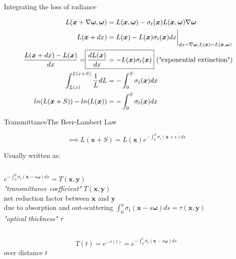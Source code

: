 \documentclass[
  english,            %
  aspectratio=169,    %
]{tumbeamer}
\newcommand\bx[0]{\bm{x}}
\newcommand\by[0]{\bm{y}}
\newcommand\bomega[0]{\bm{\omega}}
\begin{document}
\begin{frame}{Integrating the loss of radiance}
\begin{figure}[ht]
    \centering
    \scalebox{.6}{
        
    }
    \begin{align}
    \begin{aligned}
        L(\bx + \nabla\bomega,\bomega) &= 
            L(\bx,\bomega) - \sigma_t(\bx)L(\bx,\bomega)\nabla\bomega \\ 
        L(\bx + dx) &= 
            L(\bx) - L(\bx)\sigma_t(\bx)dx\bigg|_{dx=\nabla\bomega,
            L(\bx)=L(\bx, \bomega)} \\
        \frac{L(\bx + dx) - L(\bx)}{dx} = \Aboxed{\frac{dL(\bx)}{dx} &=
        -L(\bx)\sigma_t(\bx)} \text{ ("exponential extinction")}\\
        \int_{L(x)}^{L(x+S)} \frac{1}{L} dL &= -\int_0^S \sigma_t(\bx)dx\\
        ln(L(\bx+S)) - ln(L(\bx)) &= - \int_0^S \sigma_t(\bx) dx
    \end{aligned}
    \end{align}
\end{figure}
\end{frame}


\begin{frame}{Transmittance}{The Beer-Lambert Law}
\begin{figure}[ht]
$$ \implies L(\bx + S) = L(\bx)e^{-\int_0^S \sigma_t(\bx+s)ds} $$
\end{figure}

Usually written as:\\
\begin{columns}[t, onlytextwidth]
    $e^{-\int_0^y \sigma_t(\bx-s\bomega)ds} = T(\bx, \by)$
    \\
    \textit{"transmittance coefficient"} $T(\bx, \by)$\\
    net reduction factor between $\bx$ and $\by$ \\due to absorption and
    out-scattering
    $\int_0^y \sigma_t(\bx-s\bomega)ds = \tau(\bx,\by)$\\
    \textit{"optical thickness" $\tau$}
\end{columns}

\vfill
$$ T(t) = e^{-\tau(t)} = e^{-\int_0^t \sigma_t(\bx-s\bomega)ds} $$
    \centering over distance $t$

\end{frame}
\end{document}
